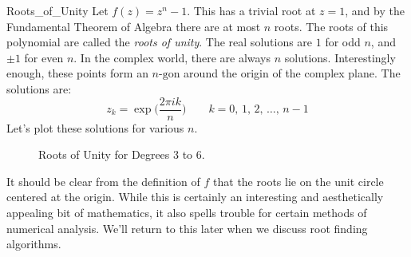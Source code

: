     \begin{lexample}{}{Roots_of_Unity}
        Let $f(z)=z^{n}-1$. This has a trivial root
        at $z=1$, and by the Fundamental Theorem of Algebra there are
        at most $n$ roots. The roots of this polynomial are called the
        \textit{roots of unity}. The real solutions are $1$ for odd $n$,
        and $\pm{1}$ for even $n$. In the complex world, there are
        always $n$ solutions. Interestingly enough, these points form an
        $n\textrm{-gon}$ around the origin of the complex plane. The
        solutions are:
        \begin{equation}
            z_{k}=\exp\Big(\frac{2\pi{i}{k}}{n}\Big)
            \quad\quad
            k=0,\,1,\,2,\,\dots,\,n-1
        \end{equation}
        Let's plot these solutions for various $n$.
        \begin{figure}[H]
            \centering
            \captionsetup{type=figure}
            
            \caption{Roots of Unity for Degrees 3 to 6.}
            \label{fig:Comp_Roots_Unity}
        \end{figure}
        It should be clear from the definition of $f$ that the roots lie
        on the unit circle centered at the origin.
        While this is certainly an interesting and aesthetically
        appealing bit of mathematics, it also spells trouble for
        certain methods of numerical analysis. We'll return to
        this later when we discuss root finding algorithms.
    \end{lexample}
